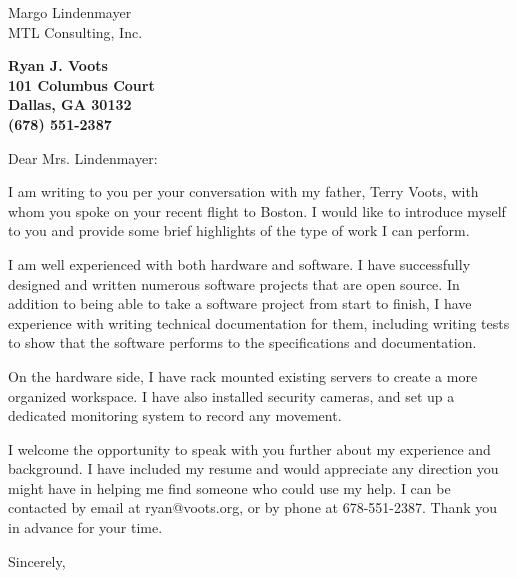 \documentclass[11pt]{letter} %
\begin{document}
\signature{Ryan Voots}                  %
\longindentation=0pt                       %
\let\raggedleft\raggedright                %
 
\begin{letter}{
Margo Lindenmayer \\
MTL Consulting, Inc.}

\begin{center}
\large\bf Ryan J. Voots \\
101 Columbus Court \\ Dallas, GA 30132 \\ (678) 551-2387
\end{center} 
\vfill %

\opening{Dear Mrs. Lindenmayer:}

I am writing to you per your conversation with my father, Terry Voots, with whom you spoke on your recent flight to Boston.  I would like to introduce myself to you and provide some brief highlights of the type of work I can perform.

I am well experienced with both hardware and software.  I have successfully designed and written numerous software projects that are open source.  In addition to being able to take a software project from start to finish, I have experience with writing technical documentation for them, including writing tests to show that the software performs to the specifications and documentation.

On the hardware side, I have rack mounted existing servers to create a more organized workspace.  I have also installed security cameras, and set up a dedicated monitoring system to record any movement.

I welcome the opportunity to speak with you further about my experience and background.  I have included my resume and would appreciate any direction you might have in helping me find someone who could use my help.  I can be contacted by email at ryan@voots.org, or by phone at 678-551-2387.  Thank you in advance for your time.  

\closing{Sincerely,}

\end{letter}
 
\end{document}
